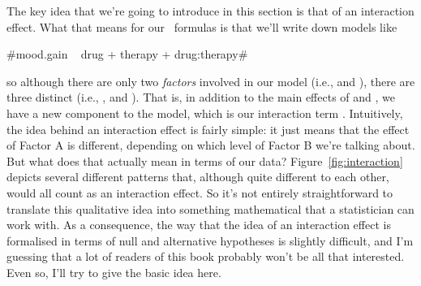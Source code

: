 
The key idea that we're going to introduce in this section is that of an interaction effect. What that means for our \R\ formulas is that we'll write down models like 
\begin{center}
\rtextverb#mood.gain ~ drug + therapy + drug:therapy# 
\end{center}
so although there are only two {\it factors} involved in our model (i.e.,  and ), there are three distinct  (i.e., ,  and ). That is, in addition to the main effects of  and , we have a new component to the model, which is our interaction term . Intuitively, the idea behind an interaction effect is fairly simple: it just means that the effect of Factor A is different, depending on which level of Factor B we're talking about. But what does that actually mean in terms of our data? Figure~\ref{fig:interaction} depicts several different patterns that, although quite different to each other, would all count as an interaction effect. So it's not entirely straightforward to translate this qualitative idea into something mathematical that a statistician can work with. As a consequence, the way that the idea of an interaction effect is formalised in terms of null and alternative hypotheses is slightly difficult, and I'm guessing that a lot of readers of this book probably won't be all that interested. Even so, I'll try to give the basic idea here.

